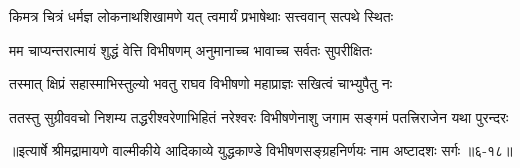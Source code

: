 \twolineshloka
{किमत्र चित्रं धर्मज्ञ लोकनाथशिखामणे}
{यत् त्वमार्यं प्रभाषेथाः सत्त्ववान् सत्पथे स्थितः} %

\twolineshloka
{मम चाप्यन्तरात्मायं शुद्धं वेत्ति विभीषणम्}
{अनुमानाच्च भावाच्च सर्वतः सुपरीक्षितः} %

\twolineshloka
{तस्मात् क्षिप्रं सहास्माभिस्तुल्यो भवतु राघव}
{विभीषणो महाप्राज्ञः सखित्वं चाभ्युपैतु नः} %

\twolineshloka
{ततस्तु सुग्रीववचो निशम्य तद्धरीश्वरेणाभिहितं नरेश्वरः}
{विभीषणेनाशु जगाम सङ्गमं पतत्त्रिराजेन यथा पुरन्दरः} %


॥इत्यार्षे श्रीमद्रामायणे वाल्मीकीये आदिकाव्ये युद्धकाण्डे विभीषणसङ्ग्रहनिर्णयः नाम अष्टादशः सर्गः ॥६-१८॥

